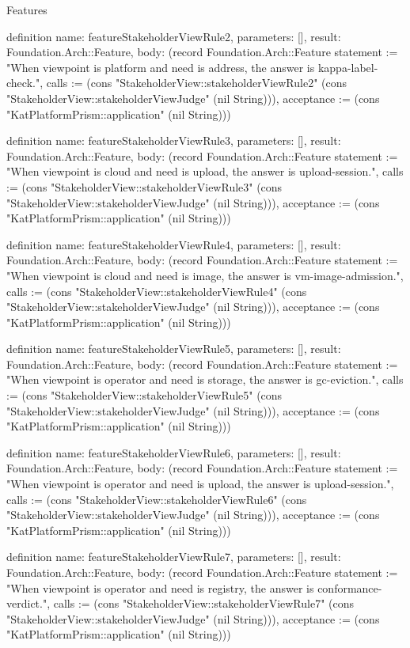 \begin{lexlean}{Features}
\begin{semanticmodule}
definition{
  name: featureStakeholderViewRule2,
  parameters: [],
  result: Foundation.Arch::Feature,
  body: (record Foundation.Arch::Feature {statement := "When viewpoint is platform and need is address, the answer is kappa-label-check.", calls := (cons "StakeholderView::stakeholderViewRule2" (cons "StakeholderView::stakeholderViewJudge" (nil String))), acceptance := (cons "KatPlatformPrism::application" (nil String))})
}

definition{
  name: featureStakeholderViewRule3,
  parameters: [],
  result: Foundation.Arch::Feature,
  body: (record Foundation.Arch::Feature {statement := "When viewpoint is cloud and need is upload, the answer is upload-session.", calls := (cons "StakeholderView::stakeholderViewRule3" (cons "StakeholderView::stakeholderViewJudge" (nil String))), acceptance := (cons "KatPlatformPrism::application" (nil String))})
}

definition{
  name: featureStakeholderViewRule4,
  parameters: [],
  result: Foundation.Arch::Feature,
  body: (record Foundation.Arch::Feature {statement := "When viewpoint is cloud and need is image, the answer is vm-image-admission.", calls := (cons "StakeholderView::stakeholderViewRule4" (cons "StakeholderView::stakeholderViewJudge" (nil String))), acceptance := (cons "KatPlatformPrism::application" (nil String))})
}

definition{
  name: featureStakeholderViewRule5,
  parameters: [],
  result: Foundation.Arch::Feature,
  body: (record Foundation.Arch::Feature {statement := "When viewpoint is operator and need is storage, the answer is gc-eviction.", calls := (cons "StakeholderView::stakeholderViewRule5" (cons "StakeholderView::stakeholderViewJudge" (nil String))), acceptance := (cons "KatPlatformPrism::application" (nil String))})
}

definition{
  name: featureStakeholderViewRule6,
  parameters: [],
  result: Foundation.Arch::Feature,
  body: (record Foundation.Arch::Feature {statement := "When viewpoint is operator and need is upload, the answer is upload-session.", calls := (cons "StakeholderView::stakeholderViewRule6" (cons "StakeholderView::stakeholderViewJudge" (nil String))), acceptance := (cons "KatPlatformPrism::application" (nil String))})
}

definition{
  name: featureStakeholderViewRule7,
  parameters: [],
  result: Foundation.Arch::Feature,
  body: (record Foundation.Arch::Feature {statement := "When viewpoint is operator and need is registry, the answer is conformance-verdict.", calls := (cons "StakeholderView::stakeholderViewRule7" (cons "StakeholderView::stakeholderViewJudge" (nil String))), acceptance := (cons "KatPlatformPrism::application" (nil String))})
}


\end{semanticmodule}
\end{lexlean}
